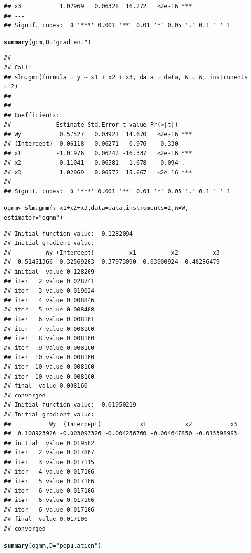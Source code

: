 \documentclass[english,12pt]{book}\usepackage[]{graphicx}\usepackage[]{xcolor}
\makeatletter
\newcommand{\hlnum}[1]{\textcolor[rgb]{0.686,0.059,0.569}{#1}}%
\newcommand{\hlstr}[1]{\textcolor[rgb]{0.192,0.494,0.8}{#1}}%
\newcommand{\hlopt}[1]{\textcolor[rgb]{0,0,0}{#1}}%
\newcommand{\hlstd}[1]{\textcolor[rgb]{0.345,0.345,0.345}{#1}}%
\newcommand{\hlkwb}[1]{\textcolor[rgb]{0.69,0.353,0.396}{#1}}%
\newcommand{\hlkwc}[1]{\textcolor[rgb]{0.333,0.667,0.333}{#1}}%
\newcommand{\hlkwd}[1]{\textcolor[rgb]{0.737,0.353,0.396}{\textbf{#1}}}%
\newenvironment{kframe}{%
 \def\at@end@of@kframe{}%
 \ifinner\ifhmode%
  \def\at@end@of@kframe{\end{minipage}}%
  \begin{minipage}{\columnwidth}%
 \fi\fi%
 \def\FrameCommand##1{\hskip\@totalleftmargin \hskip-\fboxsep
 \colorbox{shadecolor}{##1}\hskip-\fboxsep
     \hskip-\linewidth \hskip-\@totalleftmargin \hskip\columnwidth}%
 \MakeFramed {\advance\hsize-\width
   \@totalleftmargin\z@ \linewidth\hsize
   \@setminipage}}%
 {\par\unskip\endMakeFramed%
 \at@end@of@kframe}
\newenvironment{knitrout}{}{} %
\makeatother
\begin{document}
\begin{knitrout}
\begin{kframe}
\begin{verbatim}
## x3           1.02969   0.06328  16.272   <2e-16 ***
## ---
## Signif. codes:  0 '***' 0.001 '**' 0.01 '*' 0.05 '.' 0.1 ' ' 1
\end{verbatim}
\begin{alltt}
\hlkwd{summary}\hlstd{(gmm,} \hlkwc{D} \hlstd{=} \hlstr{"gradient"}\hlstd{)}
\end{alltt}
\begin{verbatim}
## 
## Call:
## slm.gmm(formula = y ~ x1 + x2 + x3, data = data, W = W, instruments = 2)
## 
## 
## Coefficients:
##             Estimate Std.Error t-value Pr(>|t|)    
## Wy           0.57527   0.03921  14.670   <2e-16 ***
## (Intercept)  0.06118   0.06271   0.976    0.330    
## x1          -1.01976   0.06242 -16.337   <2e-16 ***
## x2           0.11041   0.06581   1.678    0.094 .  
## x3           1.02969   0.06572  15.667   <2e-16 ***
## ---
## Signif. codes:  0 '***' 0.001 '**' 0.01 '*' 0.05 '.' 0.1 ' ' 1
\end{verbatim}
\begin{alltt}
\hlstd{ogmm} \hlkwb{<-} \hlkwd{slm.gmm}\hlstd{(y} \hlopt{~} \hlstd{x1} \hlopt{+} \hlstd{x2} \hlopt{+} \hlstd{x3,} \hlkwc{data} \hlstd{= data,} \hlkwc{instruments} \hlstd{=} \hlnum{2}\hlstd{,} \hlkwc{W} \hlstd{= W,}
                \hlkwc{estimator} \hlstd{=} \hlstr{"ogmm"}\hlstd{)}
\end{alltt}
\begin{verbatim}
## Initial function value: -0.1282094 
## Initial gradient value:
##          Wy (Intercept)          x1          x2          x3 
## -0.51461366 -0.32569203  0.37973090  0.03900924 -0.48286479 
## initial  value 0.128209 
## iter   2 value 0.028741
## iter   3 value 0.019024
## iter   4 value 0.008846
## iter   5 value 0.008408
## iter   6 value 0.008161
## iter   7 value 0.008160
## iter   8 value 0.008160
## iter   9 value 0.008160
## iter  10 value 0.008160
## iter  10 value 0.008160
## iter  10 value 0.008160
## final  value 0.008160 
## converged
## Initial function value: -0.01950219 
## Initial gradient value:
##           Wy  (Intercept)           x1           x2           x3 
##  0.108923926 -0.003093326 -0.004256760 -0.004647850 -0.015398993 
## initial  value 0.019502 
## iter   2 value 0.017867
## iter   3 value 0.017115
## iter   4 value 0.017106
## iter   5 value 0.017106
## iter   6 value 0.017106
## iter   6 value 0.017106
## iter   6 value 0.017106
## final  value 0.017106 
## converged
\end{verbatim}
\begin{alltt}
\hlkwd{summary}\hlstd{(ogmm,} \hlkwc{D} \hlstd{=} \hlstr{"population"}\hlstd{)}

\end{alltt}
\end{kframe}
\end{knitrout}
\end{document}
